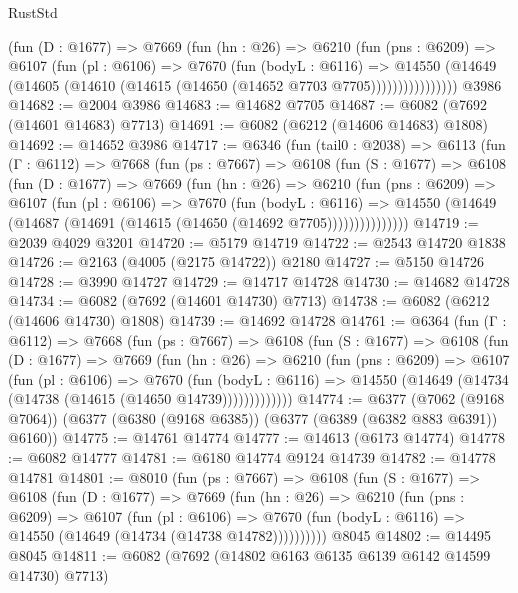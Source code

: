 \begin{lexlean}{RustStd}
\begin{coremodule}
              (fun (D : @1677) =>
              @7669
                (fun (hn : @26) =>
                @6210
                  (fun (pns : @6209) =>
                  @6107
                    (fun (pl : @6106) =>
                    @7670
                      (fun (bodyL : @6116) =>
                      @14550
                        (@14649 (@14605 (@14610 (@14615 (@14650 (@14652 @7703 @7705))))))))))))))))
    @3986
@14682 := @2004 @3986
@14683 := @14682 @7705
@14687 := @6082 (@7692 (@14601 @14683) @7713)
@14691 := @6082 (@6212 (@14606 @14683) @1808)
@14692 := @14652 @3986
@14717 := @6346
    (fun (tail0 : @2038) =>
    @6113
      (fun (Γ : @6112) =>
      @7668
        (fun (ps : @7667) =>
        @6108
          (fun (S : @1677) =>
          @6108
            (fun (D : @1677) =>
            @7669
              (fun (hn : @26) =>
              @6210
                (fun (pns : @6209) =>
                @6107
                  (fun (pl : @6106) =>
                  @7670
                    (fun (bodyL : @6116) =>
                    @14550 (@14649 (@14687 (@14691 (@14615 (@14650 (@14692 @7705)))))))))))))))
@14719 := @2039 @4029 @3201
@14720 := @5179 @14719
@14722 := @2543 @14720 @1838
@14726 := @2163 (@4005 (@2175 @14722)) @2180
@14727 := @5150 @14726
@14728 := @3990 @14727
@14729 := @14717 @14728
@14730 := @14682 @14728
@14734 := @6082 (@7692 (@14601 @14730) @7713)
@14738 := @6082 (@6212 (@14606 @14730) @1808)
@14739 := @14692 @14728
@14761 := @6364
    (fun (Γ : @6112) =>
    @7668
      (fun (ps : @7667) =>
      @6108
        (fun (S : @1677) =>
        @6108
          (fun (D : @1677) =>
          @7669
            (fun (hn : @26) =>
            @6210
              (fun (pns : @6209) =>
              @6107
                (fun (pl : @6106) =>
                @7670
                  (fun (bodyL : @6116) =>
                  @14550 (@14649 (@14734 (@14738 (@14615 (@14650 @14739)))))))))))))
@14774 := @6377
    (@7062 (@9168 @7064))
    (@6377 (@6380 (@9168 @6385)) (@6377 (@6389 (@6382 @883 @6391)) @6160))
@14775 := @14761 @14774
@14777 := @14613 (@6173 @14774)
@14778 := @6082 @14777
@14781 := @6180 @14774 @9124 @14739
@14782 := @14778 @14781
@14801 := @8010
    (fun (ps : @7667) =>
    @6108
      (fun (S : @1677) =>
      @6108
        (fun (D : @1677) =>
        @7669
          (fun (hn : @26) =>
          @6210
            (fun (pns : @6209) =>
            @6107
              (fun (pl : @6106) =>
              @7670 (fun (bodyL : @6116) => @14550 (@14649 (@14734 (@14738 @14782))))))))))
    @8045
@14802 := @14495 @8045
@14811 := @6082 (@7692 (@14802 @6163 @6135 @6139 @6142 @14599 @14730) @7713)

\end{coremodule}
\end{lexlean}
